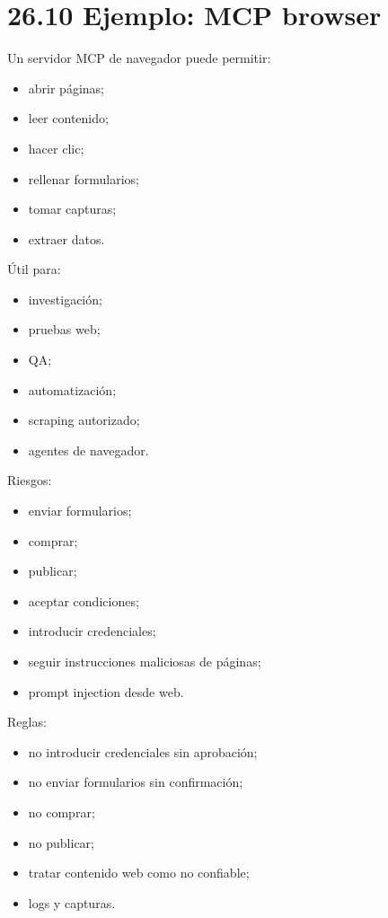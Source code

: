 \section{26.10 Ejemplo: MCP browser}\label{ejemplo-mcp-browser}

Un servidor MCP de navegador puede permitir:

\begin{itemize}
\tightlist
\item
  abrir páginas;
\item
  leer contenido;
\item
  hacer clic;
\item
  rellenar formularios;
\item
  tomar capturas;
\item
  extraer datos.
\end{itemize}

Útil para:

\begin{itemize}
\tightlist
\item
  investigación;
\item
  pruebas web;
\item
  QA;
\item
  automatización;
\item
  scraping autorizado;
\item
  agentes de navegador.
\end{itemize}

Riesgos:

\begin{itemize}
\tightlist
\item
  enviar formularios;
\item
  comprar;
\item
  publicar;
\item
  aceptar condiciones;
\item
  introducir credenciales;
\item
  seguir instrucciones maliciosas de páginas;
\item
  prompt injection desde web.
\end{itemize}

Reglas:

\begin{itemize}
\tightlist
\item
  no introducir credenciales sin aprobación;
\item
  no enviar formularios sin confirmación;
\item
  no comprar;
\item
  no publicar;
\item
  tratar contenido web como no confiable;
\item
  logs y capturas.
\end{itemize}

